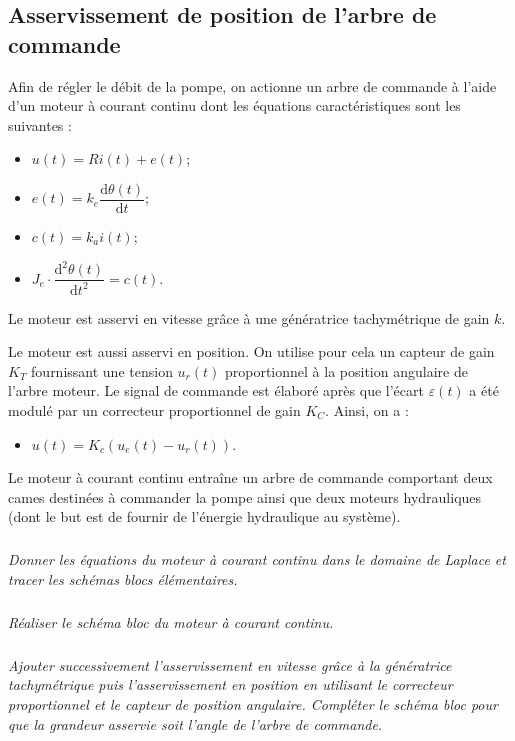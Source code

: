 \documentclass[10pt,fleqn]{article} %
\begin{document}
\begin{multicols}{2}
\subsection*{Asservissement de position de l'arbre de commande}
Afin de régler le débit de la pompe, on actionne un arbre de commande à l'aide d'un moteur à courant continu dont les équations caractéristiques sont les suivantes : 
\begin{itemize}
\item $u(t) = Ri(t)+e(t)$;
\item $e(t)=k_e \dfrac{\text{d}\theta(t)}{\text{d}t}$;
\item $c(t)=k_a i(t)$;
\item $J_e \cdot \dfrac{\text{d}^2\theta(t)}{\text{d}t^2} = c(t)$.
\end{itemize}

Le moteur est asservi en vitesse grâce à une génératrice tachymétrique de gain $k$.

Le moteur est aussi asservi en position. On utilise pour cela  un capteur de gain $K_T$ fournissant une tension $u_r(t)$ proportionnel à la position angulaire de l'arbre moteur. Le signal de commande est élaboré après que l'écart $\varepsilon(t)$ a été modulé par un correcteur proportionnel de gain $K_C$. Ainsi, on a :
\begin{itemize}
\item $u(t)=K_c \left(u_e(t)-u_r(t)\right)$.
\end{itemize}

Le moteur à courant continu entraîne un arbre de commande comportant deux cames destinées à commander la pompe ainsi que deux moteurs hydrauliques (dont le but est de fournir de l'énergie hydraulique au système). 


\subparagraph{}
\textit{Donner les équations du moteur à courant continu dans le domaine de Laplace et tracer les schémas blocs élémentaires.}
\begin{corrige}

\end{corrige}

\subparagraph{}
\textit{Réaliser le schéma bloc du moteur à courant continu.}
\begin{corrige}

\end{corrige}

\subparagraph{}
\textit{Ajouter successivement l'asservissement en vitesse grâce à la génératrice tachymétrique puis l'asservissement en position en utilisant le correcteur proportionnel et le capteur de position angulaire. Compléter le schéma bloc pour que la grandeur asservie soit l'angle de l'arbre de commande.}
\begin{corrige}


\end{corrige}
\end{multicols}
\end{document}
